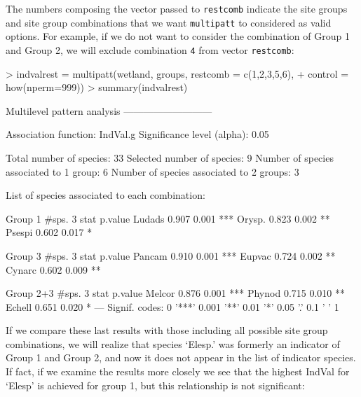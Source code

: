 \documentclass[11pt,a4paper]{article}
\begin{document}
The numbers composing the vector passed to \texttt{restcomb} indicate the site groups and site group combinations that we want \texttt{multipatt} to considered as valid options. For example, if we do not want to consider the combination of Group 1 and Group 2, we will exclude combination \texttt{4} from vector \texttt{restcomb}:
\begin{Schunk}
\begin{Sinput}
> indvalrest = multipatt(wetland, groups, restcomb = c(1,2,3,5,6), 
+                        control = how(nperm=999)) 
> summary(indvalrest)
\end{Sinput}
\begin{Soutput}
 Multilevel pattern analysis
 ---------------------------

 Association function: IndVal.g
 Significance level (alpha): 0.05

 Total number of species: 33
 Selected number of species: 9 
 Number of species associated to 1 group: 6 
 Number of species associated to 2 groups: 3 

 List of species associated to each combination: 

 Group 1  #sps.  3 
        stat p.value    
Ludads 0.907   0.001 ***
Orysp. 0.823   0.002 ** 
Psespi 0.602   0.017 *  

 Group 3  #sps.  3 
        stat p.value    
Pancam 0.910   0.001 ***
Eupvac 0.724   0.002 ** 
Cynarc 0.602   0.009 ** 

 Group 2+3  #sps.  3 
        stat p.value    
Melcor 0.876   0.001 ***
Phynod 0.715   0.010 ** 
Echell 0.651   0.020 *  
---
Signif. codes:  0 '***' 0.001 '**' 0.01 '*' 0.05 '.' 0.1 ' ' 1 
\end{Soutput}
\end{Schunk}
If we compare these last results with those including all possible site group combinations, we will realize that species `Elesp.' was formerly an indicator of Group 1 and Group 2, and now it does not appear in the list of indicator species. If fact, if we examine the results more closely we see that the highest IndVal for `Elesp' is achieved for group 1, but this relationship is not significant:
\end{document}
